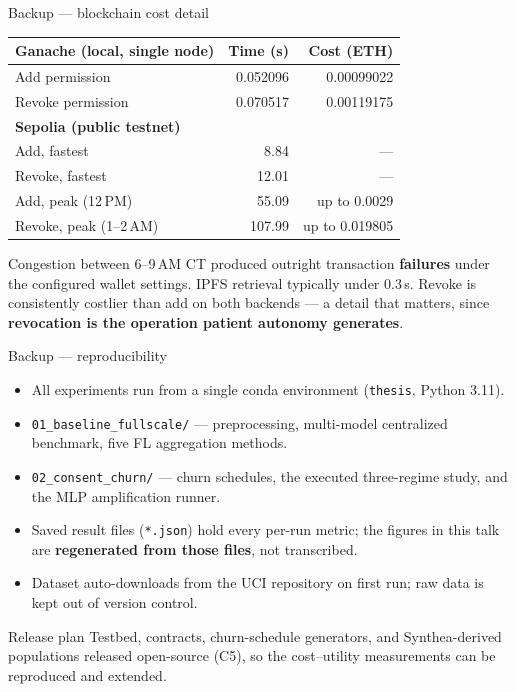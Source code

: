 \documentclass[aspectratio=169, 11pt]{beamer}
\begin{document}
\begin{frame}{Backup --- blockchain cost detail}
\begin{center}\small
\begin{tabular}{lrr}
\toprule
\textbf{Ganache (local, single node)} & Time (s) & Cost (ETH)\\
\midrule
Add permission     & 0.052096 & 0.00099022\\
Revoke permission  & 0.070517 & 0.00119175\\
\midrule
\textbf{Sepolia (public testnet)} & \multicolumn{2}{l}{}\\
\midrule
Add, fastest        & 8.84 & ---\\
Revoke, fastest     & 12.01 & ---\\
Add, peak (12\,PM)  & 55.09 & up to 0.0029\\
Revoke, peak (1--2\,AM) & 107.99 & up to 0.019805\\
\bottomrule
\end{tabular}
\end{center}
\vspace{0.5em}
{\footnotesize Congestion between 6--9\,AM CT produced outright transaction
\textbf{failures} under the configured wallet settings. IPFS retrieval
typically under 0.3\,s. Revoke is consistently costlier than add on both
backends --- a detail that matters, since \textbf{revocation is the operation
patient autonomy generates}.}
\end{frame}

\begin{frame}{Backup --- reproducibility}
\begin{itemize}
\item All experiments run from a single conda environment
      (\texttt{thesis}, Python 3.11).
\item \texttt{01\_baseline\_fullscale/} --- preprocessing, multi-model
      centralized benchmark, five FL aggregation methods.
\item \texttt{02\_consent\_churn/} --- churn schedules, the executed
      three-regime study, and the MLP amplification runner.
\item Saved result files (\texttt{*.json}) hold every per-run metric; the
      figures in this talk are \textbf{regenerated from those files}, not
      transcribed.
\item Dataset auto-downloads from the UCI repository on first run; raw data
      is kept out of version control.
\end{itemize}
\vspace{0.5em}
\begin{block}{Release plan}
Testbed, contracts, churn-schedule generators, and Synthea-derived populations
released open-source (C5), so the cost--utility measurements can be reproduced
and extended.
\end{block}
\end{frame}
\end{document}
